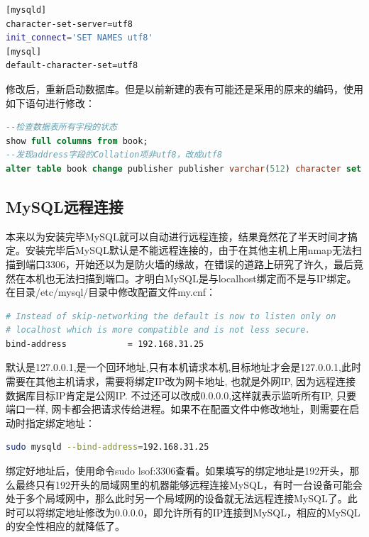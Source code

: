 \documentclass[letter]{book}
\begin{document}
\begin{lstlisting}[language=Bash]
[mysqld]
character-set-server=utf8
init_connect='SET NAMES utf8'
[mysql]
default-character-set=utf8
\end{lstlisting}

修改后，重新启动数据库。但是以前新建的表有可能还是采用的原来的编码，使用如下语句进行修改：

\begin{lstlisting}[language=SQL]
--检查数据表所有字段的状态	
show full columns from book; 
--发现address字段的Collation项非utf8，改成utf8
alter table book change publisher publisher varchar(512) character set utf8 collate utf8_unicode_ci not null;
\end{lstlisting}


\subsection{MySQL远程连接}

本来以为安装完毕MySQL就可以自动进行远程连接，结果竟然花了半天时间才搞定。安装完毕后MySQL默认是不能远程连接的，由于在其他主机上用nmap无法扫描到端口3306，开始还以为是防火墙的缘故，在错误的道路上研究了许久，最后竟然在本机也无法扫描到端口。才明白MySQL是与localhost绑定而不是与IP绑定。在目录/etc/mysql/目录中修改配置文件my.cnf：

\begin{lstlisting}[language=Bash]
# Instead of skip-networking the default is now to listen only on
# localhost which is more compatible and is not less secure.
bind-address            = 192.168.31.25
\end{lstlisting}

默认是127.0.0.1,是一个回环地址,只有本机请求本机,目标地址才会是127.0.0.1,此时需要在其他主机请求，需要将绑定IP改为网卡地址, 也就是外网IP, 因为远程连接数据库目标IP肯定是公网IP. 不过还可以改成0.0.0.0,这样就表示监听所有IP, 只要端口一样, 网卡都会把请求传给进程。如果不在配置文件中修改地址，则需要在启动时指定绑定地址：

\begin{lstlisting}[language=Bash]
sudo mysqld --bind-address=192.168.31.25
\end{lstlisting}

绑定好地址后，使用命令sudo lsof:3306查看。如果填写的绑定地址是192开头，那么最终只有192开头的局域网里的机器能够远程连接MySQL，有时一台设备可能会处于多个局域网中，那么此时另一个局域网的设备就无法远程连接MySQL了。此时可以将绑定地址修改为0.0.0.0，即允许所有的IP连接到MySQL，相应的MySQL的安全性相应的就降低了。
\end{document}
